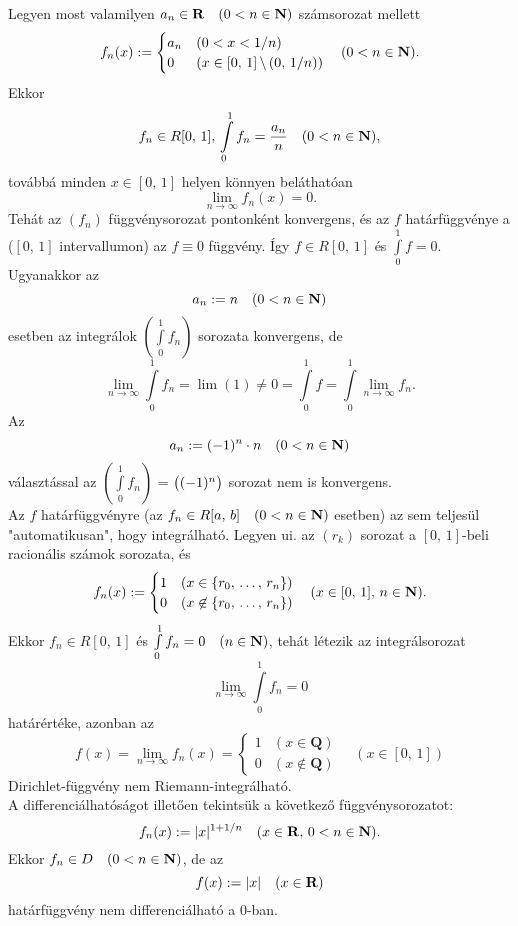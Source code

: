Legyen most valamilyen $a_n \in \mathbf{R} \quad (0 < n \in \mathbf{N})$ számsorozat mellett
\[
	f_n(x) := \begin{cases}
		a_n & (0 < x < 1/n) \\
		0 & (x \in [0, \, 1] \, \backslash \, (0, \, 1/n))
	\end{cases} \quad (0 < n \in \mathbf{N}).
\]
Ekkor
\[
	f_n \in  R[0, \, 1], \, \int\limits_0^1 f_n = \frac{a_n}{n} \quad (0 < n \in \mathbf{N}),
\]
továbbá minden $x \in [0, \, 1]$ helyen könnyen beláthatóan
\[
	\lim_{n \to \infty} f_n(x) = 0.
\]
Tehát az $(f_n)$ függvénysorozat pontonként konvergens, és az $f$ határfüggvénye a ($[0, \, 1]$ intervallumon) az $f \equiv 0$ függvény. Így $f \in R[0, \, 1]$ és $\int\limits_0^1 f = 0$. Ugyanakkor az
\[
	a_n := n \quad (0 < n \in \mathbf{N})
\]
esetben az integrálok $(\int\limits_0^1 f_n)$ sorozata konvergens, de
\[
	\lim_{n \to \infty} \int\limits_0^1 f_n = \lim(1) \neq 0 = \int\limits_0^1 f = \int\limits_0^1 \lim_{n\to \infty} f_n.
\]
Az
\[
	a_n := (-1)^n \cdot n \quad (0 < n \in \mathbf{N})
\]
választással az $(\int\limits_0^1 f_n)$  = $\big(  (-1)^n  \big)$ sorozat nem is konvergens.\\

Az $f$ határfüggvényre (az $f_n \in R[a, \, b] \quad (0 < n \in \mathbf{N} )$ esetben) az sem teljesül "automatikusan", hogy integrálható. Legyen ui. az $(r_k)$ sorozat a $[0, \, 1]$-beli racionális számok sorozata, és
\[
	f_n(x) := \begin{cases}
		1 & (x \in \{ r_0, \, \dots, \, r_n \}) \\
		0 & (x \not \in \{ r_0, \, \dots, \, r_n \})
	\end{cases} \quad (x \in [0, \, 1], \, n \in \mathbf{N}).
\] 
Ekkor $f_n \in R[0, \, 1]$ és $\int\limits_0^1 f_n = 0 \quad (n \in \mathbf{N})$, tehát létezik az integrálsorozat
\[
	\lim_{n\to \infty} \int\limits_0^1 f_n = 0
\]
határértéke, azonban az
\[
	f(x) = \lim_{n \to \infty} f_n(x) = \begin{cases}
		1 & (x \in \mathbf{Q}) \\
		0 & (x \not \in \mathbf{Q})
	\end{cases} \quad (x \in [0, \, 1])
\]
Dirichlet-függvény nem Riemann-integrálható.\\

A differenciálhatóságot illetően tekintsük a következő függvénysorozatot:
\[
	f_n(x) := |x|^{1 + 1/n} \quad (x \in \mathbf{R}, \, 0 < n \in \mathbf{N}).
\]
Ekkor $f_n \in D \quad (0 < n \in \mathbf{N})$, de az
\[
	f(x) := |x| \quad (x \in \mathbf{R})
\]
határfüggvény nem differenciálható a $0$-ban.\\

